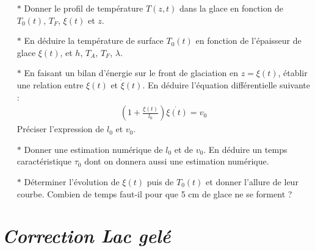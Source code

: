 \documentclass{report}
\begin{document}
\begin{itemize}

	\item[$\ast$] Donner le profil de température $T(z,t)$ dans la glace en fonction de $T_0(t)$, $T_F$, $\xi(t)$ et $z$. 
	
	\item[$\ast$] En déduire la température de surface $T_0(t)$ en fonction de l'épaisseur de glace $\xi(t)$, et $h$, $T_A$, $T_F$, $\lambda$.
	
	\item[$\ast$] En faisant un bilan d'énergie sur le front de glaciation en $z=\xi(t)$, établir une relation entre $\xi(t)$ et $\dot{\xi}(t)$. En déduire l'équation différentielle suivante :
	\begin{align*}
		\left( 1+\frac{\xi(t)}{l_0}\right) \dot{\xi(t)}=v_0
	\end{align*}
	Préciser l'expression de $l_0$ et $v_0$.
	
	\item[$\ast$] Donner une estimation numérique de $l_0$ et de $v_0$. En déduire un temps caractéristique $\tau_0$ dont on donnera aussi une estimation numérique. %
	
	\item[$\ast$] Déterminer l'évolution de $\xi(t)$ puis de $T_0(t)$ et donner l'allure de leur courbe. Combien de temps faut-il pour que 5 cm de glace ne se forment ?
	
\end{itemize}	
	
\newpage

\section*{\textit{Correction Lac gelé}}
\end{document}
